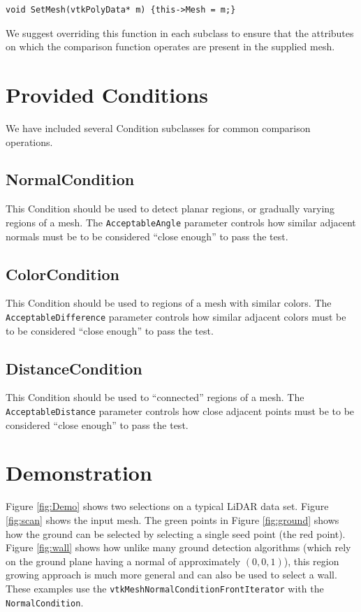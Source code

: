 \documentclass{InsightArticle}
\begin{document}
\begin{verbatim}
void SetMesh(vtkPolyData* m) {this->Mesh = m;} 
\end{verbatim}

We suggest overriding this function in each subclass to ensure that the attributes on which the comparison function operates are present in the supplied mesh.
 
\section{Provided Conditions}
We have included several Condition subclasses for common comparison operations.

\subsection{NormalCondition}
This Condition should be used to detect planar regions, or gradually varying regions of a mesh. The \verb|AcceptableAngle| parameter controls how similar adjacent normals must be to be considered ``close enough'' to pass the test.

\subsection{ColorCondition}
This Condition should be used to regions of a mesh with similar colors. The \verb|AcceptableDifference| parameter controls how similar adjacent colors must be to be considered ``close enough'' to pass the test.

\subsection{DistanceCondition}
This Condition should be used to ``connected'' regions of a mesh. The \verb|AcceptableDistance| parameter controls how close  adjacent points must be to be considered ``close enough'' to pass the test.

\section{Demonstration}

Figure \ref{fig:Demo} shows two selections on a typical LiDAR data set. Figure \ref{fig:scan} shows the input mesh. The green points in Figure \ref{fig:ground} shows how the ground can be selected by selecting a single seed point (the red point). Figure \ref{fig:wall} shows how unlike many ground detection algorithms (which rely on the ground plane having a normal of approximately $(0,0,1)$), this region growing approach is much more general and can also be used to select a wall. These examples use the \verb|vtkMeshNormalConditionFrontIterator| with the \verb|NormalCondition|.
\end{document}
